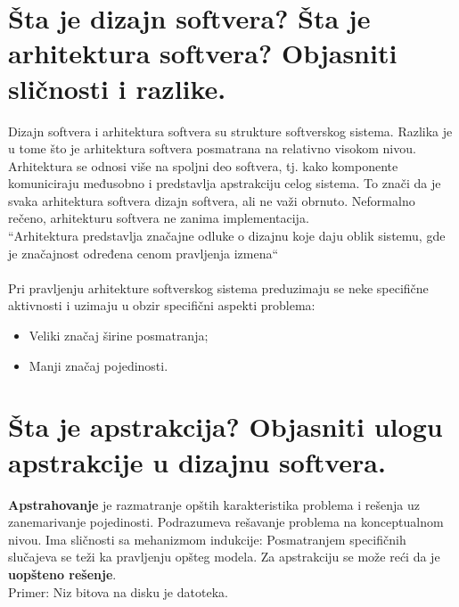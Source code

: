 \documentclass[a4paper]{article}
\begin{document}
\section{Šta je dizajn softvera? Šta je arhitektura softvera? Objasniti sličnosti i razlike.}
  \indent Dizajn softvera i arhitektura softvera su strukture softverskog sistema. Razlika je u
  tome što je arhitektura softvera posmatrana na relativno visokom nivou. Arhitektura se odnosi više
  na spoljni deo softvera, tj. kako komponente komuniciraju međusobno i predstavlja apstrakciju 
  celog sistema. To znači da je svaka arhitektura softvera dizajn softvera, ali ne važi obrnuto.
  Neformalno rečeno, arhitekturu softvera ne zanima implementacija. \\

  ``Arhitektura predstavlja značajne odluke o dizajnu koje daju oblik sistemu, gde je značajnost
  određena cenom pravljenja izmena``
  \\[5pt]
  \\

  Pri pravljenju arhitekture softverskog sistema preduzimaju se neke specifične aktivnosti i
  uzimaju u obzir specifični aspekti problema:
  \begin{itemize}
    \item Veliki značaj širine posmatranja;
    \item Manji značaj pojedinosti. 
  \end{itemize}
  
  
\section{Šta je apstrakcija? Objasniti ulogu apstrakcije u dizajnu softvera.}
  \textbf{Apstrahovanje} je razmatranje opštih karakteristika problema i rešenja uz zanemarivanje
  pojedinosti. Podrazumeva rešavanje problema na konceptualnom nivou. Ima sličnosti sa
  mehanizmom indukcije: Posmatranjem specifičnih slučajeva se teži ka pravljenju opšteg modela.
  Za apstrakciju se može reći da je \textbf{uopšteno rešenje}.\\
  \indent Primer: Niz bitova na disku je datoteka.
\end{document}
